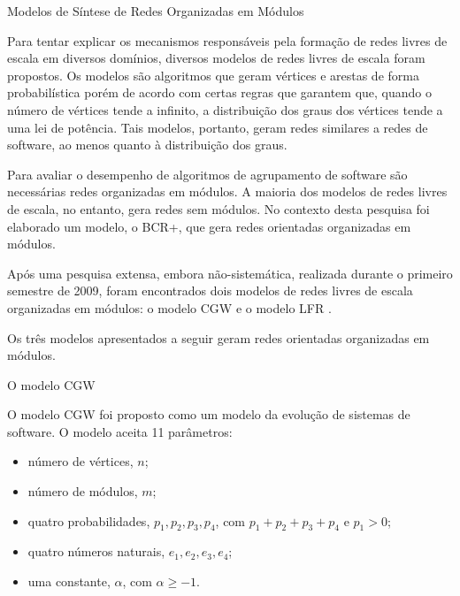\begin{section}{Modelos de Síntese de Redes Organizadas em Módulos}

Para tentar explicar os mecanismos responsáveis pela formação de redes livres de escala em diversos domínios, diversos modelos de redes livres de escala foram propostos. Os modelos são algoritmos que geram vértices e arestas de forma probabilística porém de acordo com certas regras que garantem que, quando o número de vértices tende a infinito, a distribuição dos graus dos vértices tende a uma lei de potência. Tais modelos, portanto, geram redes similares a redes de software, ao menos quanto à distribuição dos graus.

Para avaliar o desempenho de algoritmos de agrupamento de software são necessárias redes organizadas em módulos. A maioria dos modelos de redes livres de escala, no entanto, gera redes sem módulos. No contexto desta pesquisa foi elaborado um modelo, o BCR+, que gera redes orientadas organizadas em módulos. 

Após uma pesquisa extensa, embora não-sistemática, realizada durante o primeiro semestre de 2009, foram encontrados dois modelos de redes livres de escala organizadas em módulos: o modelo CGW \cite{Chen2008} e o modelo LFR \cite{Lancichinetti2009}.

Os três modelos apresentados a seguir geram redes orientadas organizadas em módulos. 


\begin{subsection}{O modelo CGW}

O modelo CGW \cite{Chen2008} foi proposto como um modelo da evolução de sistemas de software. O modelo aceita 11 parâmetros:

\begin{itemize}
\item número de vértices, $n$;
\item número de módulos, $m$;
\item quatro probabilidades, $p_1, p_2, p_3, p_4$, com $p_1 + p_2 + p_3 + p_4$ e $p_1 > 0$;
\item quatro números naturais, $e_1, e_2, e_3, e_4$;
\item uma constante, $\alpha$, com $\alpha \ge -1$.
\end{itemize}


\end{subsection}
\end{section}
